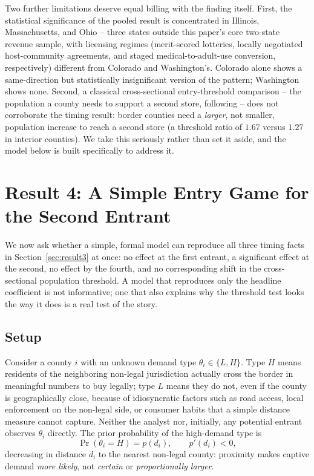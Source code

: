\documentclass[12pt]{article}
\begin{document}
Two further limitations deserve equal billing with the finding itself. First, the statistical significance
of the pooled result is concentrated in Illinois, Massachusetts, and Ohio -- three states outside this
paper's core two-state revenue sample, with licensing regimes (merit-scored lotteries, locally negotiated
host-community agreements, and staged medical-to-adult-use conversion, respectively) different from Colorado
and Washington's. Colorado alone shows a same-direction but statistically insignificant version of the
pattern; Washington shows none. Second, a classical cross-sectional entry-threshold comparison -- the
population a county needs to support a second store, following \citet{BresnahanReiss1990} -- does not
corroborate the timing result: border counties need a \emph{larger}, not smaller, population increase to
reach a second store (a threshold ratio of $1.67$ versus $1.27$ in interior counties). We take this
seriously rather than set it aside, and the model below is built specifically to address it.

\section{Result 4: A Simple Entry Game for the Second Entrant}
\label{sec:model}

We now ask whether a simple, formal model can reproduce all three timing facts in Section~\ref{sec:result3}
at once: no effect at the first entrant, a significant effect at the second, no effect by the fourth, and no
corresponding shift in the cross-sectional population threshold. A model that reproduces only the headline
coefficient is not informative; one that also explains why the threshold test looks the way it does is a
real test of the story.

\subsection{Setup}

Consider a county $i$ with an unknown demand type $\theta_i \in \{L, H\}$. Type $H$ means residents of the
neighboring non-legal jurisdiction actually cross the border in meaningful numbers to buy legally; type $L$
means they do not, even if the county is geographically close, because of idiosyncratic factors such as road
access, local enforcement on the non-legal side, or consumer habits that a simple distance measure cannot
capture. Neither the analyst nor, initially, any potential entrant observes $\theta_i$ directly. The prior
probability of the high-demand type is
\begin{equation}
\Pr(\theta_i = H) = p(d_i), \qquad p'(d_i) < 0,
\end{equation}
decreasing in distance $d_i$ to the nearest non-legal county: proximity makes captive demand \emph{more
likely}, not \emph{certain} or \emph{proportionally larger}.
\end{document}
